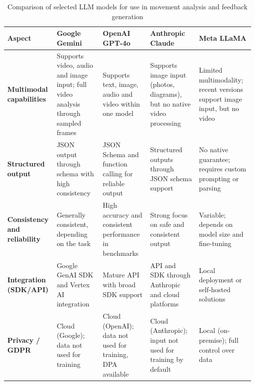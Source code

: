 \begin{table}[h]
    \centering
    \footnotesize
    \setlength{\tabcolsep}{8pt}
    \begin{tabular}{p{2.5cm}p{3.1cm}p{3.1cm}p{3.1cm}p{3.1cm}}
        \toprule
        \textbf{Aspect} & \textbf{Google Gemini} & \textbf{OpenAI GPT-4o} & \textbf{Anthropic Claude} & \textbf{Meta LLaMA} \\
        \midrule
        
        \textbf{Multimodal capabilities} 
        & Supports video, audio and image input; full video analysis through sampled frames \autocite{gemini_video}
        & Supports text, image, audio and video within one model \autocite{gpt4o}
        & Supports image input (photos, diagrams), but no native video processing \autocite{claude_vision}
        & Limited multimodality; recent versions support image input, but no video \autocite{llama_multimodal} \\
        
        \textbf{Structured output} 
        & JSON output through schema with high consistency \autocite{gemini_json}
        & JSON Schema and function calling for reliable output \autocite{openai_json}
        & Structured outputs through JSON schema support \autocite{claude_json}
        & No native guarantee; requires custom prompting or parsing \autocite{llama_privacy} \\
        
        \textbf{Consistency and reliability} 
        & Generally consistent, depending on the task
        & High accuracy and consistent performance in benchmarks \autocite{gpt4o}
        & Strong focus on safe and consistent output
        & Variable; depends on model size and fine-tuning \autocite{llama_privacy} \\
        
        \textbf{Integration (SDK/API)} 
        & Google GenAI SDK and Vertex AI integration \autocite{gemini_sdk}
        & Mature API with broad SDK support \autocite{openai_api}
        & API and SDK through Anthropic and cloud platforms \autocite{claude_sdk}
        & Local deployment or self-hosted solutions \autocite{llama_privacy}\\
        
        \textbf{Privacy / GDPR} 
        & Cloud (Google); data not used for training \autocite{gemini_privacy}
        & Cloud (OpenAI); data not used for training, DPA available \autocite{openai_privacy}
        & Cloud (Anthropic); input not used for training by default \autocite{claude_privacy}
        & Local (on-premise); full control over data \autocite{llama_privacy} \\
        
        \bottomrule
    \end{tabular}
    \caption{Comparison of selected LLM models for use in movement analysis and feedback generation}
\end{table}

